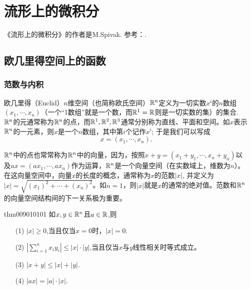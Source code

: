 \part{流形上的微积分}
《流形上的微积分》的作者是M.Spivak. 参考：\cite{CalculusOnManifoldsSpivak1980}. 

\chapter{欧几里得空间上的函数}\label{chapter00901}
\section{范数与内积}\label{section0090101}
欧几里得（Euclid）$n$维空间（也简称欧氏空间）$\mathbb{R}^n$定义为一切实数$x^i$的$n$数组$(x_1,\cdots, x_n)$（一个“1数组”就是一个数，而$\mathbb{R}^1=\mathbb{R}$则是一切实数的集）的集合. $\mathbb{R}^n$的元通常称为$\mathbb{R}^n$的点，而$\mathbb{R}^1,\mathbb{R}^2,\mathbb{R}^3$通常分别称为直线、平面和空间。如$x$表示$\mathbb{R}^n$的一元素，则$x$是一个$n$数组，其中第$i$个记作$x^i$; 于是我们可以写成
\[
x = (x_1, \cdots, x_n).
\]

$\mathbb{R}^n$中的点也常常称为$\mathbb{R}^n$中的向量，因为，按照$x+y=(x_1+y_1,\cdots, x_n+y_n)$以及$ax=(ax_1,\cdots, ax_n)$作为运算，$\mathbb{R}^n$是一个向量空间（在实数域上，维数为$n$）。在这向量空间中，向量$x$的长度的概念，通常称为$x$的范数$|x|$, 并定义为$|x| = \sqrt{(x_1)^2 + \cdots + (x_n)^2}$。如$n=1$，则$|x|$就是$x$的通常的绝对值。范数和$\mathbb{R}^n$的向量空间结构间的下一关系极为重要。
\begin{theorem}{}{thm009010101}
如$x,y \in \mathbb{R}^n$且$a \in \mathbb{R}$,则
\begin{enumerate}
\item[(1)] $|x| \ge 0$,当且仅当$x=0$时，$|x|=0$.
\item[(2)] $\left|\sum\limits_{i=1}^{n}{x_iy_i}\right| \le |x| \cdot |y|$,当且仅当$x$与$y$线性相关时等式成立。
\item[(3)] $|x+y| \le |x| + |y|$.
\item[(4)] $|ax| = |a| \cdot |x|$.
\end{enumerate}
\end{theorem}

